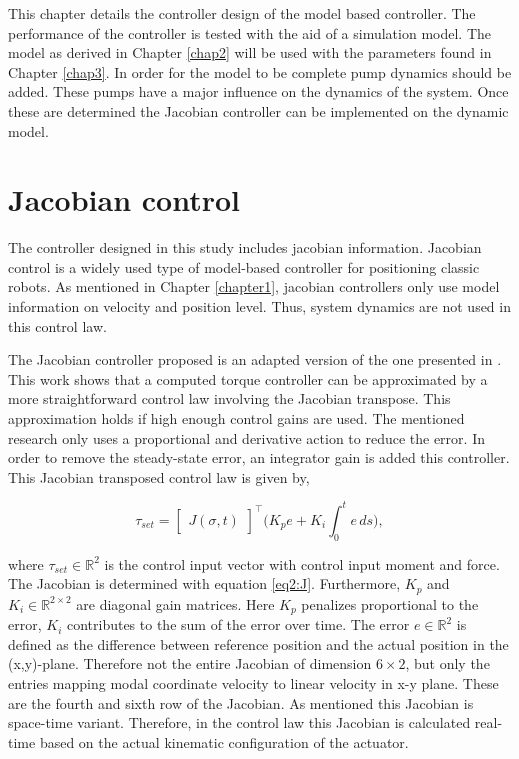 \label{chap4}

This chapter details the controller design of the model based controller. The performance of the controller is tested with the aid of a simulation model. The model as derived in Chapter \ref{chap2} will be used with the parameters found in Chapter \ref{chap3}. In order for the model to be complete pump dynamics should be added. These pumps have a major influence on the dynamics of the system. Once these are determined the Jacobian controller can be implemented on the dynamic model. 


\section{Jacobian control}


The controller designed in this study includes jacobian information. Jacobian control is a widely used type of model-based controller for positioning classic robots. As mentioned in Chapter \ref{chapter1}, jacobian controllers only use model information on velocity and position level. Thus, system dynamics are not used in this control law.


The Jacobian controller proposed is an adapted version of the one presented in \cite{MOOSAVIAN20071226}. This work shows that a computed torque controller can be approximated by a more straightforward control law involving the Jacobian transpose. This approximation holds if high enough control gains are used. The mentioned research only uses a proportional and derivative action to reduce the error. In order to remove the steady-state error, an integrator gain is added this controller. This Jacobian transposed control law is given by,


\begin{equation}
    \tau_{set} = \begin{bmatrix}J(\sigma,t)\end{bmatrix}^\top \Big(K_p e + K_i \int_0^t e \hspace{2pt} ds \Big), 
    \label{eq:tau}
\end{equation}

where $\tau_{set} \in \mathbb{R}^2$ is the control input vector with control input moment and force. The Jacobian is determined with equation \ref{eq2:J}. Furthermore, $K_p$ and $K_i \in \mathbb{R}^{2\times 2}$ are diagonal gain matrices. Here $K_p$ penalizes proportional to the error, $K_i$ contributes to the sum of the error over time. The error $e \in \mathbb{R}^2$ is defined as the difference between reference position and the actual position in the (x,y)-plane. Therefore not the entire Jacobian of dimension $6 \times 2$, but only the entries mapping modal coordinate velocity to linear velocity in x-y plane. These are the fourth and sixth row of the Jacobian. As mentioned this Jacobian is space-time variant. Therefore, in the control law this Jacobian is calculated real-time based on the actual kinematic configuration of the actuator. 

